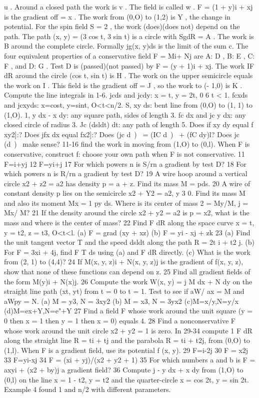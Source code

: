 u . Around a closed path the work is v . The field is
called w . F = (1 + y)i + xj is the gradient off = x .
The work from (0,O) to (1,2) is Y , the change in potential.
For the spin field S = 2 , the work (does)(does not)
depend on the path. The path (x, y) = (3 cos t, 3 sin t) is a
circle with SgdR = A . The work is B around the
complete circle. Formally jg(x, y)ds is the limit of the sum
c.
The four equivalent properties of a conservative field F =
Mi+ Nj are A: D , B: E , C: F , and D: G . Test D is (passed)(not passed) by F = (y + 1)i + xj. The work
IF dR around the circle (cos t, sin t) is H . The work on
the upper semicircle equals the work on I . This field is
the gradient off = J , so the work to (- 1,0) is K .
Compute the line integrals in 1-6.
jcds and jcdy: x = t, y = 2t, 0 6 t < 1.
fcxds and jcxyds: x=cost, y=sint, O<t<n/2.
S, xy ds: bent line from (0,O) to (1, 1) to (1,O).
1, y dx - x dy: any square path, sides of length 3.
fc dx and jc y dx: any closed circle of radius 3.
Jc (dsldt) dt: any path of length 5.
Does if xy dy equal f xy2]:?
Does jfx dx equal fx2]:?
Does (jc d~)~ = (IC d~)~ + (fC dy)l?
Does jc (d~)~ make sense?
11-16 find the work in moving from (1,O) to (0,l). When F
is conservative, construct f: choose your own path when F is
not conservative.
11 F=i+yj 12 F=yi+j
17 For which powers n is S/rn a gradient by test D?
18 For which powers n is R/rn a gradient by test D?
19 A wire hoop around a vertical circle x2 + z2 = a2 has
density p = a + z. Find its mass M = pds.
20 A wire of constant density p lies on the semicircle
x2 + Y2 = a2, y 3 0. Find its mass M and also its moment
Mx = 1 py ds. Where is its center of mass 2 = My/M, j = Mx/
M?
21 If the density around the circle x2 + y2 = a2 is p = x2, what
is the mass and where is the center of mass?
22 Find F dR along the space curve x = t, y = t2, z = t3,
O<t<l.
(a) F = grad (xy + xz) (b) F = yi - xj + zk
23 (a) Find the unit tangent vector T and the speed dsldt
along the path R = 2t i + t2 j.
(b) For F = 3xi + 4j, find F T ds using (a) and F dR
directly.
(c) What is the work from (2, 1) to (4,4)?
24 If M(x, y, z)i + N(x, y, z)j is the gradient of f(x, y, z), show
that none of these functions can depend on z.
25 Find all gradient fields of the form M(y)i + N(x)j.
26 Compute the work W(x, y) = j M dx + N dy on the
straight line path (xt, yt) from t = 0 to t = 1. Test to see if aW/
ax = M and aWpy = N.
(a) M = y3, N = 3xy2 (b) M = x3, N = 3yx2
(c)M=x/y,N=y/x (d)M=ex+Y,N=e"+Y
27 Find a field F whose work around the unit square (y = 0
then x = 1 then y = 1 then x = 0) equals 4.
28 Find a nonconservative F whose work around the unit
circle x2 + y2 = 1 is zero.
In 29-34 compute 1 F dR along the straight line R = ti + tj
and the parabola R = ti + t2j, from (0,O) to (1,l). When F is a
gradient field, use its potential f (x, y).
29 F=i-2j 30 F = x2j
33 F=yi-xj 34 F = (xi + yj)/(x2 + y2 + 1)
35 For which numbers a and b is F = axyi + (x2 + by)j a
gradient field?
36 Compute j - y dx + x dy from (1,O) to (0,l) on the line
x = 1 - t2, y = t2 and the quarter-circle x = cos 2t, y = sin 2t.
Example 4 found 1 and n/2 with different parameters. 

